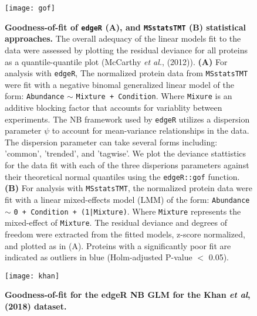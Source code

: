 

\begin{figure}[h] %
	\begin{fullwidth}
		\begin{center}
		\texttt{[image: gof]}
		\caption{\textbf{Goodness-of-fit of \texttt{edgeR} (A), and 
		\texttt{MSstatsTMT} (B) statistical approaches.} The overall
		adequacy of the linear models fit to the data were assessed 
		by plotting the residual deviance for all proteins as a 
		quantile-quantile plot (McCarthy \textit{et al.}, (2012)). 
		\textbf{(A)} For analysis with \texttt{edgeR}, The normalized
		protein data from \texttt{MSstatsTMT} were fit with a negative
		binomal generalized linear model of the form: 
		\texttt{Abundance} $\sim$ \texttt{Mixture + Condition}.
		Where \texttt{Mixure} is an additive blocking factor that 
		accounts for variablity between experiments. 
		The NB framework used by \texttt{edgeR} utilizes a dispersion 
			parameter $\psi$
		to account for mean-variance relationships in the data.
		The dispersion parameter can take several forms including:
                'common', 'trended', and 'tagwise'. We plot the deviance
		stattistics for the data fit with each of
		the three disperions parameters against their 
		theoretical normal quantiles using the \texttt{edgeR::gof}
		function. \textbf{(B)} For analysis with \texttt{MSstatsTMT},
		the normalized protein data were fit with a linear mixed-effects 
		model (LMM) of the form: 
		\texttt{Abundance} $\sim$ \texttt{0 + Condition + (1|Mixture)}. 
		Where \texttt{Mixture} represents the mixed-effect
		of \texttt{Mixture}. The residual deviance and degrees of 
		freedom were extracted from the fitted models, z-score
		normalized, and plotted as in (A). Proteins with a significantly 
		poor fit are indicated as outliers in blue 
		(Holm-adjusted P-value $<$ 0.05).}
		\label{fig:gof}
	\end{center}
	\end{fullwidth}
\end{figure}

\newpage

\begin{figure}[h] %
  \begin{fullwidth}
  \begin{center}
	  \texttt{[image: khan]}
	  \caption{\textbf{Goodness-of-fit for the edgeR NB GLM for the Khan
	  \textit{et al}, (2018) dataset.} } %
	  \label{fig:khan}
  \end{center}
  \end{fullwidth}
\end{figure}


